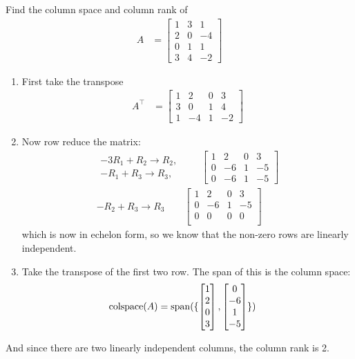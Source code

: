 \begin{example}
Find the column space and column rank of
\begin{align*} A & =
\begin{bmatrix} %
1 & 3 & 1\\
2 & 0 &  -4\\
0 & 1 & 1 \\
3 & 4 & -2
\end{bmatrix}
\end{align*}

\begin{enumerate}
\item First take the transpose
%
\begin{align*}
A^{\intercal} & = \begin{bmatrix}
1 & 2 & 0 & 3 \\
3 & 0 & 1 & 4 \\
1 & -4 & 1 & -2
\end{bmatrix}
\end{align*}
\item Now row reduce the matrix:
%
\begin{align*}
\begin{array}{r}
-3R_1 + R_2 \rightarrow R_2, \\
-R_1 + R_3 \rightarrow R_3,
\end{array} \qquad
\begin{bmatrix}
1& 2 & 0 & 3 \\
0 & -6 &1 & -5 \\
0 & -6 & 1 & -5
\end{bmatrix} \\
-R_2 + R_3 \rightarrow R_3 \qquad
\begin{bmatrix}
1& 2 & 0 & 3 \\
0 & -6 &1 & -5 \\
0 & 0 & 0 & 0 \\
\end{bmatrix}
\end{align*}
which is now in echelon form, so we know that the non-zero rows are linearly independent.

\item Take the transpose of the first two row.  The span of this is the column space:
%
\begin{align*}
\text{colspace}(A) & = \operatorname{span}(\{ \begin{bmatrix}
1 \\ 2 \\ 0 \\ 3
\end{bmatrix}, \begin{bmatrix}
0 \\ -6 \\ 1 \\ -5
\end{bmatrix} \} )
\end{align*}
\end{enumerate}
And since there are two linearly independent columns, the column rank is 2.
\end{example}

